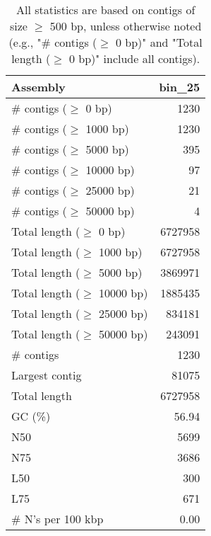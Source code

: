 \documentclass[12pt,a4paper]{article}
\begin{document}
\begin{table}[ht]
\begin{center}
\caption{All statistics are based on contigs of size $\geq$ 500 bp, unless otherwise noted (e.g., "\# contigs ($\geq$ 0 bp)" and "Total length ($\geq$ 0 bp)" include all contigs).}
\begin{tabular}{|l*{1}{|r}|}
\hline
Assembly & bin\_25 \\ \hline
\# contigs ($\geq$ 0 bp) & 1230 \\ \hline
\# contigs ($\geq$ 1000 bp) & 1230 \\ \hline
\# contigs ($\geq$ 5000 bp) & 395 \\ \hline
\# contigs ($\geq$ 10000 bp) & 97 \\ \hline
\# contigs ($\geq$ 25000 bp) & 21 \\ \hline
\# contigs ($\geq$ 50000 bp) & 4 \\ \hline
Total length ($\geq$ 0 bp) & 6727958 \\ \hline
Total length ($\geq$ 1000 bp) & 6727958 \\ \hline
Total length ($\geq$ 5000 bp) & 3869971 \\ \hline
Total length ($\geq$ 10000 bp) & 1885435 \\ \hline
Total length ($\geq$ 25000 bp) & 834181 \\ \hline
Total length ($\geq$ 50000 bp) & 243091 \\ \hline
\# contigs & 1230 \\ \hline
Largest contig & 81075 \\ \hline
Total length & 6727958 \\ \hline
GC (\%) & 56.94 \\ \hline
N50 & 5699 \\ \hline
N75 & 3686 \\ \hline
L50 & 300 \\ \hline
L75 & 671 \\ \hline
\# N's per 100 kbp & 0.00 \\ \hline
\end{tabular}
\end{center}
\end{table}
\end{document}
